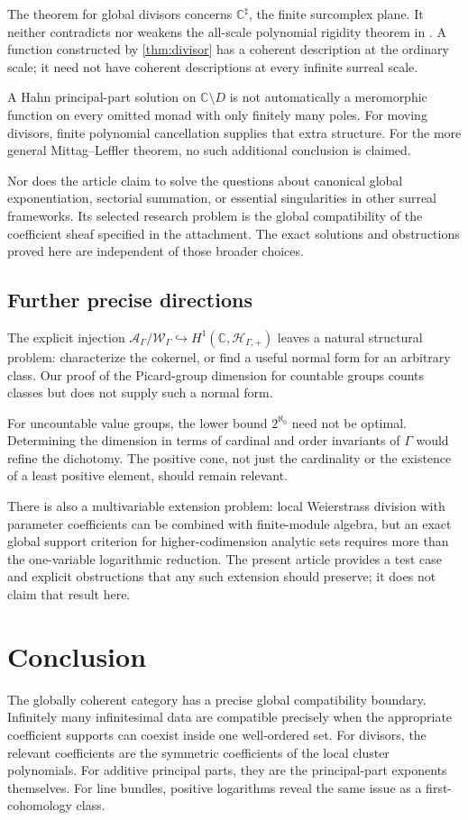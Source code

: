 \documentclass[11pt,letterpaper]{article}
\theoremstyle{definition}
\theoremstyle{remark}
\newcommand{\C}{\mathbb C}
\newcommand{\HP}{\mathscr H_{\Gamma,+}}
\newcommand{\sh}{^{\sharp}}
\numberwithin{equation}{section}
\begin{document}
The theorem for global divisors concerns $\C\sh$, the finite surcomplex plane. It neither contradicts nor weakens the all-scale polynomial rigidity theorem in \cite[\S12]{Source}. A function constructed by \cref{thm:divisor} has a coherent description at the ordinary scale; it need not have coherent descriptions at every infinite surreal scale.

A Hahn principal-part solution on $\C\setminus D$ is not automatically a meromorphic function on every omitted monad with only finitely many poles. For moving divisors, finite polynomial cancellation supplies that extra structure. For the more general Mittag--Leffler theorem, no such additional conclusion is claimed.

Nor does the article claim to solve the questions about canonical global exponentiation, sectorial summation, or essential singularities in other surreal frameworks. Its selected research problem is the global compatibility of the coefficient sheaf specified in the attachment. The exact solutions and obstructions proved here are independent of those broader choices.

\subsection{Further precise directions}
The explicit injection $\mathcal A_\Gamma/\mathcal W_\Gamma\hookrightarrow H^1(\C,\HP)$ leaves a natural structural problem: characterize the cokernel, or find a useful normal form for an arbitrary class. Our proof of the Picard-group dimension for countable groups counts classes but does not supply such a normal form.

For uncountable value groups, the lower bound $2^{\aleph_0}$ need not be optimal. Determining the dimension in terms of cardinal and order invariants of $\Gamma$ would refine the dichotomy. The positive cone, not just the cardinality or the existence of a least positive element, should remain relevant.

There is also a multivariable extension problem: local Weierstrass division with parameter coefficients can be combined with finite-module algebra, but an exact global support criterion for higher-codimension analytic sets requires more than the one-variable logarithmic reduction. The present article provides a test case and explicit obstructions that any such extension should preserve; it does not claim that result here.

\section{Conclusion}
The globally coherent category has a precise global compatibility boundary. Infinitely many infinitesimal data are compatible precisely when the appropriate coefficient supports can coexist inside one well-ordered set. For divisors, the relevant coefficients are the symmetric coefficients of the local cluster polynomials. For additive principal parts, they are the principal-part exponents themselves. For line bundles, positive logarithms reveal the same issue as a first-cohomology class.
\end{document}
